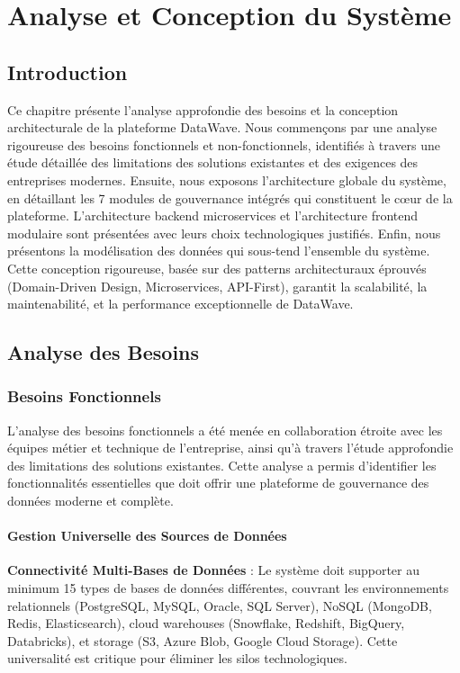 \chapter{Analyse et Conception du Système}

\section*{Introduction}

Ce chapitre présente l'analyse approfondie des besoins et la conception architecturale de la plateforme DataWave. Nous commençons par une analyse rigoureuse des besoins fonctionnels et non-fonctionnels, identifiés à travers une étude détaillée des limitations des solutions existantes et des exigences des entreprises modernes. Ensuite, nous exposons l'architecture globale du système, en détaillant les 7 modules de gouvernance intégrés qui constituent le cœur de la plateforme. L'architecture backend microservices et l'architecture frontend modulaire sont présentées avec leurs choix technologiques justifiés. Enfin, nous présentons la modélisation des données qui sous-tend l'ensemble du système. Cette conception rigoureuse, basée sur des patterns architecturaux éprouvés (Domain-Driven Design, Microservices, API-First), garantit la scalabilité, la maintenabilité, et la performance exceptionnelle de DataWave.

\section{Analyse des Besoins}

\subsection{Besoins Fonctionnels}

L'analyse des besoins fonctionnels a été menée en collaboration étroite avec les équipes métier et technique de l'entreprise, ainsi qu'à travers l'étude approfondie des limitations des solutions existantes. Cette analyse a permis d'identifier les fonctionnalités essentielles que doit offrir une plateforme de gouvernance des données moderne et complète.

\subsubsection{Gestion Universelle des Sources de Données}

\textbf{Connectivité Multi-Bases de Données} : Le système doit supporter au minimum 15 types de bases de données différentes, couvrant les environnements relationnels (PostgreSQL, MySQL, Oracle, SQL Server), NoSQL (MongoDB, Redis, Elasticsearch), cloud warehouses (Snowflake, Redshift, BigQuery, Databricks), et storage (S3, Azure Blob, Google Cloud Storage). Cette universalité est critique pour éliminer les silos technologiques.

